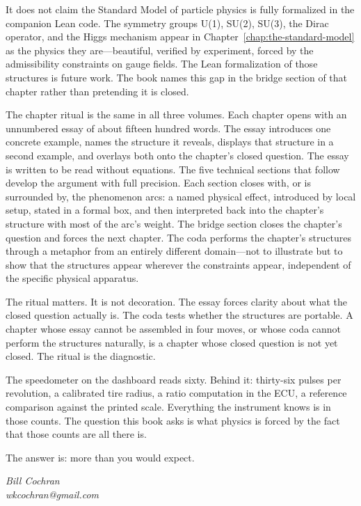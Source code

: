 It does not claim the Standard Model of particle physics is fully formalized
in the companion Lean code. The symmetry groups U(1), SU(2), SU(3), the Dirac
operator, and the Higgs mechanism appear in Chapter~\ref{chap:the-standard-model}
as the physics they are---beautiful, verified by experiment, forced by the
admissibility constraints on gauge fields. The Lean formalization of those
structures is future work. The book names this gap in the bridge section of that
chapter rather than pretending it is closed.

\bigskip

The chapter ritual is the same in all three volumes. Each chapter opens with an
unnumbered essay of about fifteen hundred words. The essay introduces one
concrete example, names the structure it reveals, displays that structure in a
second example, and overlays both onto the chapter's closed question. The essay
is written to be read without equations. The five technical sections that follow
develop the argument with full precision. Each section closes with, or is
surrounded by, the phenomenon arcs: a named physical effect, introduced by
local setup, stated in a formal box, and then interpreted back into the
chapter's structure with most of the arc's weight. The bridge section closes
the chapter's question and forces the next chapter. The coda performs the
chapter's structures through a metaphor from an entirely different domain---not
to illustrate but to show that the structures appear wherever the constraints
appear, independent of the specific physical apparatus.

The ritual matters. It is not decoration. The essay forces clarity about what
the closed question actually is. The coda tests whether the structures are
portable. A chapter whose essay cannot be assembled in four moves, or whose coda
cannot perform the structures naturally, is a chapter whose closed question is
not yet closed. The ritual is the diagnostic.

\bigskip

The speedometer on the dashboard reads sixty. Behind it: thirty-six pulses per
revolution, a calibrated tire radius, a ratio computation in the ECU, a
reference comparison against the printed scale. Everything the instrument knows
is in those counts. The question this book asks is what physics is forced by the
fact that those counts are all there is.

The answer is: more than you would expect.

\bigskip

\noindent\textit{Bill Cochran}\\
\noindent\textit{wkcochran@gmail.com}
